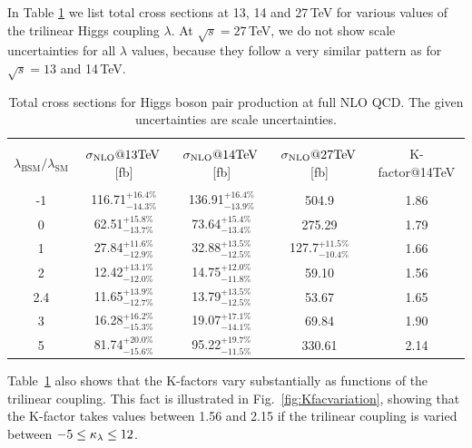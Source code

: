 In Table \ref{tab:sigmatot} we list total cross sections at 13, 14 and 27\,TeV for various values of the trilinear Higgs coupling $\lambda$. 
At $\sqrt{s}=27$\,TeV, we do not show scale uncertainties for all $\lambda$ values,  because they follow a very similar pattern as for $\sqrt{s}=13$ and 14\,TeV.
\begin{table}[htb]
\begin{center}
\begin{tabular}{| c | c | c |c|c|}
\hline
&&&&\\
$\lambda_{\mathrm{BSM}}/\lambda_{\mathrm{SM}}$ & $\sigma_{\rm{NLO}}@13 \mathrm{TeV}$\,[fb]& $\sigma_{\rm{NLO}}@14 \mathrm{TeV}$\,[fb] & $\sigma_{\rm{NLO}}@27 \mathrm{TeV}$\,[fb] &K-factor@14TeV\\
&&&&\\
\hline
-1& 116.71$^{+16.4\%}_{-14.3\%}$  & 136.91$^{+16.4\%}_{-13.9\%}$& 504.9 & 1.86 \\
\hline
0& 62.51$^{+15.8\%}_{-13.7\%}$ & 73.64$^{+15.4\%}_{-13.4\%}$& 275.29& 1.79  \\
\hline 
1& 27.84$^{+11.6\%}_{-12.9\%}$ & 32.88$^{+13.5\%}_{-12.5\%}$&127.7$^{+11.5\%}_{-10.4\%}$ &1.66\\
\hline
2 & 12.42$^{+13.1\%}_{-12.0\%}$ & 14.75$^{+12.0\%}_{-11.8\%}$ &  59.10 & 1.56 \\
\hline
2.4& 11.65$^{+13.9\%}_{-12.7\%}$ & 13.79$^{+13.5\%}_{-12.5\%}$& 53.67 & 1.65 \\
\hline
3& 16.28$^{+16.2\%}_{-15.3\%}$ & 19.07$^{+17.1\%}_{-14.1\%}$ & 69.84 & 1.90 \\
\hline 
5& 81.74$^{+20.0\%}_{-15.6\%}$  & 95.22$^{+19.7\%}_{-11.5\%}$& 330.61 & 2.14 \\
\hline 
\end{tabular}
\end{center}
\caption{Total cross sections for Higgs boson pair production at full NLO QCD. The given uncertainties are scale uncertainties. 
\label{tab:sigmatot}}
\end{table}
Table~\ref{tab:sigmatot} also shows that the K-factors vary substantially as functions of the trilinear coupling.
This fact is illustrated in Fig.~\ref{fig:Kfacvariation}, showing that the K-factor takes values between 1.56 and 2.15
if the trilinear coupling is varied between $-5\leq \kappa_{\lambda}\leq 12$.

